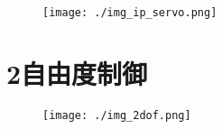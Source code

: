 \documentclass[a4paper,12pt]{jsarticle}
\begin{document}
\begin{figure}[H]
  \begin{center}
    \texttt{[image: ./img\_ip\_servo.png]}
  \end{center}
  \caption{}\label{img:img_ip_servo}
\end{figure}









\appendix
\section{2自由度制御}

\begin{figure}[H]
  \begin{center}
    \texttt{[image: ./img\_2dof.png]}
  \end{center}
  \caption{}\label{img:img_2dof}
\end{figure}
\end{document}
